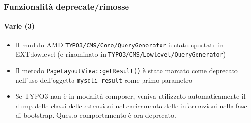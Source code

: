 \begin{frame}[fragile]
	\frametitle{Funzionalità deprecate/rimosse}
	\framesubtitle{Varie (3)}

	\begin{itemize}

		\item Il modulo AMD \texttt{TYPO3/CMS/Core/QueryGenerator} è stato spostato in EXT:lowlevel\newline
			\small
				(e rinominato in \texttt{TYPO3/CMS/Lowlevel/QueryGenerator})
			\normalsize

		\item Il metodo \texttt{PageLayoutView::getResult()} è stato marcato come deprecato
			nell'uso dell'oggetto \texttt{mysqli\_result} come primo parametro

		\item Se TYPO3 non è in modalità composer, veniva utilizzato automaticamente il dump delle classi delle estensioni
			nel caricamento delle informazioni nella fase di bootstrap. Questo comportamento è ora deprecato.
	\end{itemize}

\end{frame}

